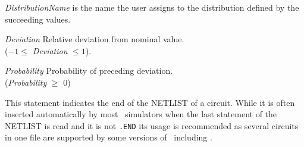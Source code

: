 \begin{widelist}
\item[{\it DistributionName}] is the name the user  assigns to the distribution defined by the succeeding values.

\item[{\it Deviation}] Relative deviation from nominal value.\\
($-1 \le$ {\it Deviation} $ \le 1$).

\item[{\it Probability}] Probability of preceding deviation.\\
({\it Probability} $\ge$ 0)

\end{widelist}


%
%

This statement indicates the end of the NETLIST of a circuit.
{
While it is often inserted automatically by most \spice\ simulators when the
last statement of the NETLIST is read and it is not {\tt .END}
}
its usage is
recommended as several circuits in one file are supported by
{some versions of \spice\ including \pspice .}


